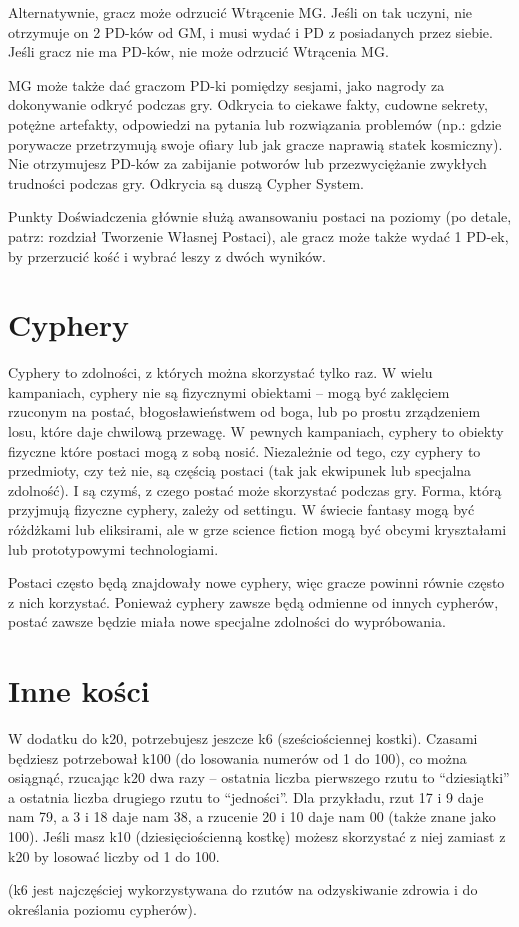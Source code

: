 Alternatywnie, gracz może odrzucić Wtrącenie MG. Jeśli on tak uczyni, nie otrzymuje on 2 PD-ków od GM, i musi wydać i PD z posiadanych przez siebie. Jeśli gracz nie ma PD-ków, nie może odrzucić Wtrącenia MG.

MG może także dać graczom PD-ki pomiędzy sesjami, jako nagrody za dokonywanie odkryć podczas gry. Odkrycia to ciekawe fakty, cudowne sekrety, potężne artefakty, odpowiedzi na pytania lub rozwiązania problemów (np.: gdzie porywacze przetrzymują swoje ofiary lub jak gracze naprawią statek kosmiczny). Nie otrzymujesz PD-ków za zabijanie potworów lub przezwyciężanie zwykłych trudności podczas gry. Odkrycia są duszą Cypher System.

Punkty Doświadczenia głównie służą awansowaniu postaci na poziomy (po detale, patrz: rozdział Tworzenie Własnej Postaci), ale gracz może także wydać 1 PD-ek, by przerzucić kość i wybrać leszy z dwóch wyników. 

\section  {Cyphery}

Cyphery to zdolności, z których można skorzystać tylko raz. W wielu kampaniach, cyphery nie są fizycznymi obiektami – mogą być zaklęciem rzuconym na postać, błogosławieństwem od boga, lub po prostu zrządzeniem losu, które daje chwilową przewagę. W pewnych kampaniach, cyphery to obiekty fizyczne które postaci mogą z sobą nosić. Niezależnie od tego, czy cyphery to przedmioty, czy też nie, są częścią postaci (tak jak ekwipunek lub specjalna zdolność). I są czymś, z czego postać może skorzystać podczas gry. Forma, którą przyjmują fizyczne cyphery, zależy od settingu. W świecie fantasy mogą być różdżkami lub eliksirami, ale w grze science fiction mogą być obcymi kryształami lub prototypowymi technologiami.

Postaci często będą znajdowały nowe cyphery, więc gracze powinni równie często z nich korzystać. Ponieważ cyphery zawsze będą odmienne od innych cypherów, postać zawsze będzie miała nowe specjalne zdolności do wypróbowania. 

\section {Inne kości}

W dodatku do k20, potrzebujesz jeszcze k6 (sześciościennej kostki). Czasami będziesz potrzebował k100 (do losowania numerów od 1 do 100), co można osiągnąć, rzucając k20 dwa razy – ostatnia liczba pierwszego rzutu to “dziesiątki” a ostatnia liczba drugiego rzutu to “jedności”. Dla przykładu, rzut 17 i 9 daje nam 79, a 3 i 18 daje nam 38, a rzucenie 20 i 10 daje nam 00 (także znane jako 100). Jeśli masz k10 (dziesięciościenną kostkę) możesz skorzystać z niej zamiast z k20 by losować liczby od 1 do 100.

(k6 jest najczęściej wykorzystywana do rzutów na odzyskiwanie zdrowia i do określania poziomu cypherów).